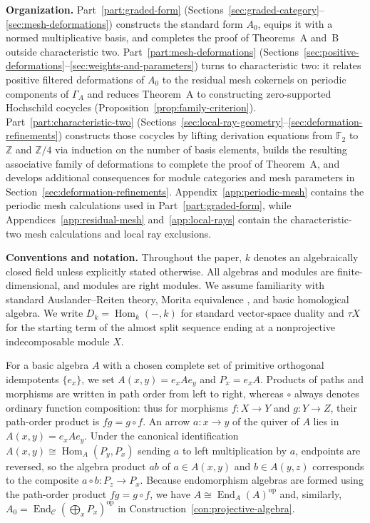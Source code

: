 \documentclass[a4paper,reqno,11pt]{amsart}
\theoremstyle{definition}
\DeclareMathOperator{\End}{End}
\DeclareMathOperator{\Hom}{Hom}
\newcommand{\op}{\mathrm{op}}
\newcommand{\C}{\mathcal C}
\newcommand{\Z}{\mathbb Z}
\newcommand{\F}{\mathbb F}
\begin{document}
\medskip
{}\label{subsec:intro-organization}
\noindent\textbf{Organization.}
Part~\ref{part:graded-form}
(Sections~\ref{sec:graded-category}--\ref{sec:mesh-deformations})
constructs the standard form $A_0$, equips it with a normed multiplicative
basis, and completes the proof of Theorems~A and~B outside characteristic
two. Part~\ref{part:mesh-deformations}
(Sections~\ref{sec:positive-deformations}--\ref{sec:weights-and-parameters})
turns to characteristic two: it relates positive filtered deformations of
$A_0$ to the residual mesh cokernels on periodic components of $\Gamma_A$
and reduces Theorem~A to constructing zero-supported Hochschild cocycles
(Proposition~\ref{prop:family-criterion}).
Part~\ref{part:characteristic-two}
(Sections~\ref{sec:local-ray-geometry}--\ref{sec:deformation-refinements})
constructs those cocycles by lifting derivation equations from $\F_2$ to
$\Z$ and $\Z/4$ via induction on the number of basis elements, builds the
resulting associative family of deformations to complete the proof of
Theorem~A, and develops additional consequences for module categories and
mesh parameters in Section~\ref{sec:deformation-refinements}.
Appendix~\ref{app:periodic-mesh} contains the periodic mesh calculations
used in Part~\ref{part:graded-form}, while
Appendices~\ref{app:residual-mesh} and~\ref{app:local-rays} contain the
characteristic-two mesh calculations and local ray exclusions.

\medskip
\noindent\textbf{Conventions and notation.}
Throughout the paper, $k$ denotes an algebraically closed field unless
explicitly stated otherwise. All algebras and modules are finite-dimensional,
and modules are right modules. We assume familiarity with standard
Auslander--Reiten theory, Morita equivalence \cite{ARS}, and basic
homological algebra. We write $D_k=\Hom_k(-,k)$ for standard vector-space
duality and $\tau X$ for the starting term of the almost split sequence
ending at a nonprojective indecomposable module $X$.

For a basic algebra $A$ with a chosen complete set of primitive orthogonal
idempotents $\{e_x\}$, we set $A(x,y)=e_xAe_y$ and $P_x=e_xA$. Products of
paths and morphisms are written in path order from left to right, whereas
$\circ$ always denotes ordinary function composition: thus for morphisms
$f:X\to Y$ and $g:Y\to Z$, their path-order product is $fg=g\circ f$. An
arrow $a:x\to y$ of the quiver of $A$ lies in $A(x,y)=e_xAe_y$. Under the
canonical identification $A(x,y)\cong\Hom_A(P_y,P_x)$ sending $a$ to left
multiplication by $a$, endpoints are reversed, so the algebra product $ab$ of
$a\in A(x,y)$ and $b\in A(y,z)$ corresponds to the composite
$a\circ b:P_z\to P_x$. Because endomorphism algebras are formed using the
path-order product $fg=g\circ f$, we have $A\cong\End_A(A)^{\op}$ and,
similarly, $A_0=\End_{\C}(\bigoplus_x P_x)^{\op}$ in
Construction~\ref{con:projective-algebra}.
\end{document}
